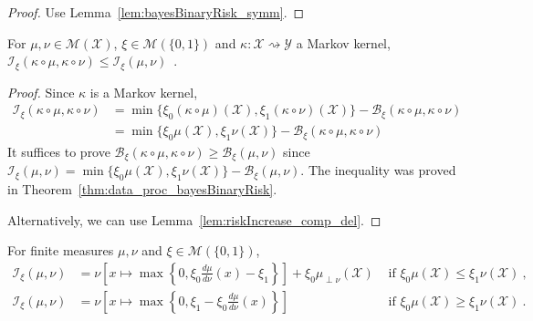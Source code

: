 \begin{proof}%
{}
Use Lemma~\ref{lem:bayesBinaryRisk_symm}.
\end{proof}

\begin{theorem}
  \label{thm:data_proc_statInfo}
  For $\mu, \nu \in \mathcal M(\mathcal X)$, $\xi \in \mathcal M(\{0,1\})$ and $\kappa : \mathcal X \rightsquigarrow \mathcal Y$ a Markov kernel, $\mathcal I_\xi(\kappa \circ \mu, \kappa \circ \nu) \le \mathcal I_\xi(\mu, \nu)$~.
\end{theorem}

\begin{proof}%
{}
Since $\kappa$ is a Markov kernel,
\begin{align*}
\mathcal I_\xi(\kappa \circ \mu, \kappa \circ \nu)
&= \min\{\xi_0(\kappa \circ \mu)(\mathcal X), \xi_1(\kappa \circ \nu)(\mathcal X)\} - \mathcal B_\xi(\kappa \circ \mu, \kappa \circ \nu)
\\
&= \min\{\xi_0 \mu(\mathcal X), \xi_1 \nu(\mathcal X)\} - \mathcal B_\xi(\kappa \circ \mu, \kappa \circ \nu)
\end{align*}
It suffices to prove $\mathcal B_\xi(\kappa \circ \mu, \kappa \circ \nu) \ge \mathcal B_\xi(\mu, \nu)$ since $\mathcal I_\xi(\mu, \nu) = \min\{\xi_0\mu(\mathcal X), \xi_1\nu(\mathcal X)\} - \mathcal B_\xi(\mu, \nu)$.
The inequality was proved in Theorem~\ref{thm:data_proc_bayesBinaryRisk}.

Alternatively, we can use Lemma~\ref{lem:riskIncrease_comp_del}.
\end{proof}

\begin{theorem}
  \label{thm:statInfo_eq_integral}
  For finite measures $\mu, \nu$ and $\xi \in \mathcal M(\{0,1\})$,
  \begin{align*}
  \mathcal I_\xi(\mu, \nu)
  &= \nu\left[ x \mapsto \max \left\{0 , \xi_0\frac{d \mu}{d\nu}(x) - \xi_1 \right\} \right] + \xi_0 \mu_{\perp \nu}(\mathcal X) & \text{ if } \xi_0 \mu(\mathcal X) \le \xi_1 \nu(\mathcal X)
  \: , \\
  \mathcal I_\xi(\mu, \nu)
  &= \nu\left[ x \mapsto \max \left\{0 , \xi_1 - \xi_0\frac{d \mu}{d\nu}(x) \right\} \right] & \text{ if } \xi_0 \mu(\mathcal X) \ge \xi_1 \nu(\mathcal X)
  \: .
  \end{align*}
  
\end{theorem}

